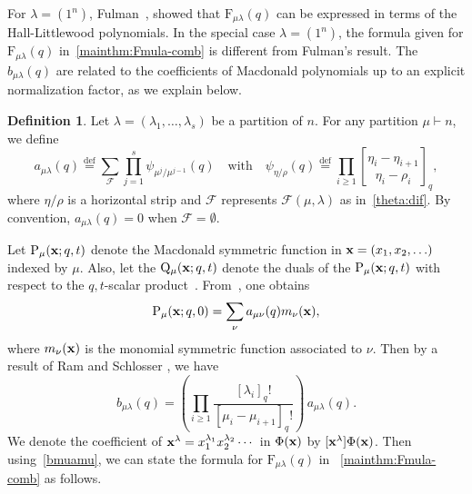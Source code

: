 \documentclass[12pt,a4paper,reqno]{amsart}
\theoremstyle{plain}
\theoremstyle{definition}
\newtheorem{definition}[theorem]{Definition}
\newcommand{\defin}{\overset{\mathrm{def}}{=}}
\newcommand{\1}{\mathds{1}}
\renewcommand{\P}{\mathrm{P}}
\newcommand{\F}{\mathrm{F}}
\newcommand{\Q}{\mathrm{Q}}
\newcommand{\x}{{\bf x}}
\begin{document}
For $\lambda=(1^n)$, Fulman~\cite{Fulman}, showed that $\F_{\mu\lambda}(q)$ can be expressed in terms of the Hall-Littlewood
polynomials. In the special case $\lambda=(1^n)$, 
the formula given for $\F_{\mu\lambda}(q)$ in~\cref{mainthm:Fmula-comb} is different from Fulman's result. The $b_{\mu\lambda}(q)$ are related to the coefficients of Macdonald polynomials  up to an explicit normalization factor, as we explain below.

\begin{definition}\label{psi:dif}
Let $\lambda=(\lambda_1,\dots,\lambda_s)$ be a partition of $n$. For any partition $\mu\vdash n$, we  define 
\begin{equation}\label{functiona:dif}
  a_{\mu\lambda}(q)\defin \sum_{\mathcal F} \prod_{j=1}^{s} \psi_{\mu^{j}/\mu^{j-1}}(q)
\quad\text{with}\quad
\psi_{\eta/\rho}(q)\defin \prod_{i\geq 1}{\eta_i-\eta_{i+1} \brack \eta_i-\rho_i}_q,
\end{equation}
where $\eta/\rho$ is a horizontal strip and $\mathcal{F}$ represents $\mathcal{F}(\mu, \lambda)$ as in~\cref{theta:dif}. By convention, %
$a_{\mu\lambda}(q)=0$ when $\mathcal F=\emptyset$.
\end{definition}




  Let $\P_{\mu}(\x;q,t)$ denote the  Macdonald symmetric function in  $\x=(x_1,x_2,\ldots)$ indexed by $\mu$.
Also, let the $\Q_\mu(\x;q,t)$ denote the duals of the  $\P_\mu(\x;q,t)$ with respect to the $q,t$-scalar product~\cite[p. 323, Eq. (4.12)]{Macdonald}.
From~\cite[p.~346, Eq. (7.13')]{Macdonald}, one obtains 
\begin{equation}\label{monomila_expansion:Mac}
    \P_{\mu}(\x;q,0)=\sum_{\nu}a_{\mu\nu}(q)m_\nu (\x),
\end{equation}
 where $m_\nu(\x)$ is the monomial symmetric function associated to $\nu$. Then by a result of Ram and Schlosser \cite[Theorem~5.3]{Ram}, we have  
\begin{equation}\label{bmuamu}
b_{\mu\lambda}(q)=\left(\prod_{i\geq 1}\frac{[\lambda_i]_q!}{[\mu_i-\mu_{i+1}]_q!}\right)\, a_{\mu\lambda}(q).
\end{equation}
We denote the coefficient of $\x^\lambda=x_1^{\lambda_1}x_2^{\lambda_2}\cdots$ in  $\Phi(\x)$ by $[\x^\lambda]\Phi(\x)$. 
Then using~\cref{bmuamu}, we can state the formula for $\F_{\mu\lambda}(q)$ in ~\cref{mainthm:Fmula-comb}  as follows.
\end{document}
